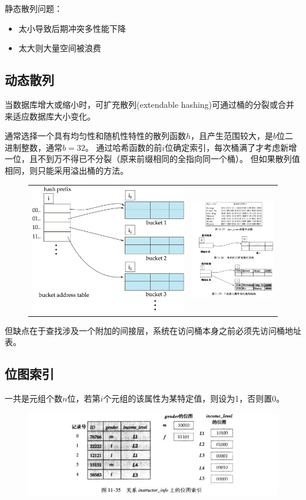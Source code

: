 静态散列问题：
\begin{itemize}
	\item 太小导致后期冲突多性能下降
	\item 太大则大量空间被浪费
\end{itemize}

\subsection{动态散列}
当数据库增大或缩小时，可扩充散列(extendable hashing)可通过桶的分裂或合并来适应数据库大小变化。

通常选择一个具有均匀性和随机性特性的散列函数$h$，且产生范围较大，是$b$位二进制整数，通常$b=32$。
通过哈希函数的前$i$位确定索引，每次桶满了才考虑新增一位，且不到万不得已不分裂（原来前缀相同的全指向同一个桶）。
但如果散列值相同，则只能采用溢出桶的方法。
\begin{figure}[H]
\centering
\begin{tabular}{cc}
\includegraphics[width=0.5\linewidth]{fig/extendable_hash.png}&
\includegraphics[width=0.5\linewidth]{fig/extendable_hash_eg.png}
\end{tabular}
\end{figure}
但缺点在于查找涉及一个附加的间接层，系统在访问桶本身之前必须先访问桶地址表。

\subsection{位图索引}
一共是元组个数$n$位，若第$i$个元组的该属性为某特定值，则设为1，否则置0。
\begin{figure}[H]
\centering
\includegraphics[width=0.9\linewidth]{fig/bitmap.png}
\end{figure}